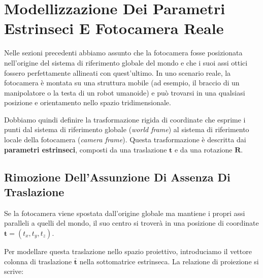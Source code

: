 ﻿\documentclass[11pt, a4paper]{article}
\begin{document}
\newpage

\section{Modellizzazione Dei Parametri Estrinseci E Fotocamera Reale}

Nelle sezioni precedenti abbiamo assunto che la fotocamera fosse posizionata nell'origine del sistema di riferimento globale del mondo e che i suoi assi ottici fossero perfettamente allineati con quest'ultimo. In uno scenario reale, la fotocamera è montata su una struttura mobile (ad esempio, il braccio di un manipolatore o la testa di un robot umanoide) e può trovarsi in una qualsiasi posizione e orientamento nello spazio tridimensionale.


Dobbiamo quindi definire la trasformazione rigida di coordinate che esprime i punti dal sistema di riferimento globale (\emph{world frame}) al sistema di riferimento locale della fotocamera (\emph{camera frame}). Questa trasformazione è descritta dai \textbf{parametri estrinseci}, composti da una traslazione $\bm{t}$ e da una rotazione $\bm{R}$.



\subsection{Rimozione Dell'Assunzione Di Assenza Di Traslazione}

Se la fotocamera viene spostata dall'origine globale ma mantiene i propri assi paralleli a quelli del mondo, il suo centro si troverà in una posizione di coordinate $\bm{t} = (t_x, t_y, t_z)$.


Per modellare questa traslazione nello spazio proiettivo, introduciamo il vettore colonna di traslazione $\bar{\bm{t}}$ nella sottomatrice estrinseca. La relazione di proiezione si scrive:
\end{document}
